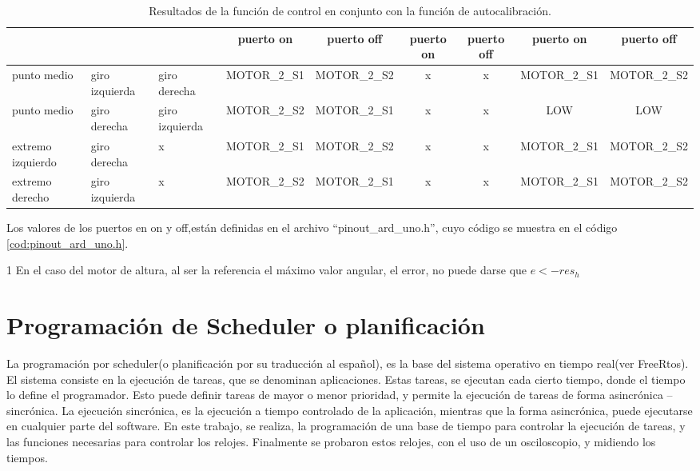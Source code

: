 \begin{table}[ht]
{\begin{threeparttable}
\begin{tabular}{|p{1.5cm}|p{1.5cm}|p{1.5cm}|c|c|c|c|c|c|}
		& &  & puerto on & puerto off &puerto on & puerto off&puerto on & puerto off\\ 
		\hline 
		punto medio & giro izquierda & giro derecha &  MOTOR\_2\_S1 &  MOTOR\_2\_S2  & x & x &MOTOR\_2\_S1 &MOTOR\_2\_S2 \\ 
		\hline 
		punto medio & giro derecha & giro izquierda & MOTOR\_2\_S2 & MOTOR\_2\_S1 & x & x & LOW &LOW \\ 
		\hline  
		extremo izquierdo & giro derecha &x & MOTOR\_2\_S1 & MOTOR\_2\_S2  &   x  & x  &MOTOR\_2\_S1 &MOTOR\_2\_S2 \\ 
		\hline 
		extremo derecho & giro izquierda & x & MOTOR\_2\_S2 & MOTOR\_2\_S1  & x  & x  &MOTOR\_2\_S1 &MOTOR\_2\_S2 \\ 
		\hline 
	\end{tabular}
	\begin{tablenotes}
	 	\small 
	 	\item Los valores de los puertos en on y off,están definidas en el archivo ``pinout\_ard\_uno.h'', cuyo código se muestra en el código  \ref{cod:pinout_ard_uno.h}.
	 	
	 	\item [1] En el caso del motor de altura, al ser la referencia el máximo valor angular, el error, no puede darse que $e < -res_h $  
	\end{tablenotes}
	\end{threeparttable}
}	
	\caption{Resultados de la función de control en conjunto con la función de autocalibración.}
	\label{tab:result_control}
\end{table}


\section{Programación de Scheduler o planificación}

La programación por scheduler(o planificación por su traducción al español), es la base del sistema operativo en tiempo real(ver FreeRtos). El sistema consiste en la ejecución de tareas, que se denominan aplicaciones. Estas tareas, se ejecutan cada cierto tiempo, donde el tiempo lo define el programador. Esto puede definir tareas de mayor o menor prioridad, y permite la ejecución de tareas de forma asincrónica – sincrónica. La ejecución sincrónica, es la ejecución a tiempo controlado de la aplicación, mientras que la forma asincrónica, puede ejecutarse en cualquier parte del software. En este trabajo, se realiza, la programación de una base de tiempo para controlar la ejecución de tareas, y las funciones necesarias para controlar los relojes. Finalmente se probaron estos relojes, con el uso de un osciloscopio, y midiendo los tiempos.

